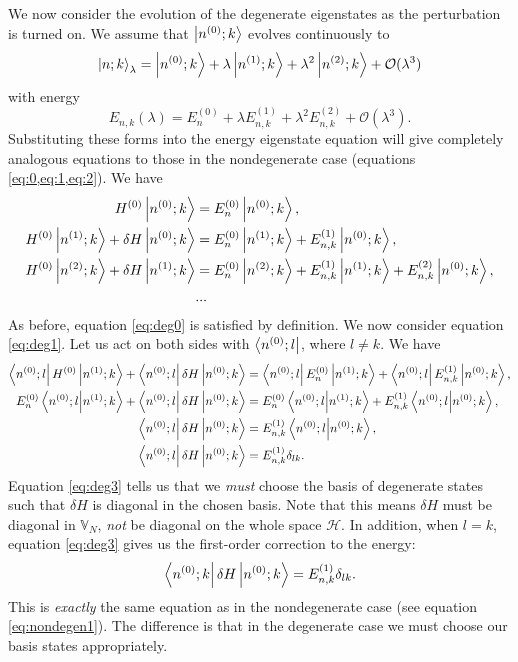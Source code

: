 We now consider the evolution of the degenerate eigenstates as the perturbation is turned on. We assume that $\left| n^{(0)};k \right\rangle$ evolves continuously to \[\left| n;k \right\rangle_\lambda = \left| n^{(0)};k \right\rangle + \lambda \left| n^{(1)};k \right\rangle + \lambda^2 \left| n^{(2)};k \right\rangle + \mathcal{O}(\lambda^3) \]
with energy 
\[ E_{n,k} (\lambda) = E_n^{(0)} + \lambda E_{n,k}^{(1)} + \lambda^2 E_{n,k}^{(2)} + \mathcal{O}(\lambda^3).\]
Substituting these forms into the energy eigenstate equation will give completely analogous equations to those in the nondegenerate case (equations \cref{eq:0,eq:1,eq:2}). We have
\begin{align}
H^{(0)} \left| n^{(0)};k \right\rangle &= E_n^{(0)} \left| n^{(0)};k \right\rangle,  \label{eq:deg0}\\
H^{(0)} \left| n^{(1)};k \right\rangle + \delta H \left| n^{(0)};k \right\rangle &= E_n^{(0)} \left| n^{(1)};k \right\rangle + E_{n,k}^{(1)} \left| n^{(0)};k \right\rangle,  \label{eq:deg1}\\
H^{(0)} \left| n^{(2)};k \right\rangle + \delta H \left| n^{(1)};k \right\rangle &= E_n^{(0)} \left| n^{(2)};k \right\rangle + E_{n,k}^{(1)} \left| n^{(1)};k \right\rangle + E_{n,k}^{(2)} \left| n^{(0)};k \right\rangle,  \label{eq:deg2}\\
&... \nonumber
\end{align} 
As before, equation \ref{eq:deg0} is satisfied by definition. We now consider equation \ref{eq:deg1}. Let us act on both sides with $\left\langle n^{(0)}; l \right|$, where $l \neq k$. We have 
\begin{align}
\left\langle n^{(0)}; l \right|H^{(0)} \left| n^{(1)};k \right\rangle+\left\langle n^{(0)}; l \right| \delta H \left| n^{(0)};k \right\rangle &= \left\langle n^{(0)}; l \right|E_n^{(0)} \left| n^{(1)};k \right\rangle+\left\langle n^{(0)}; l \right|E_{n,k}^{(1)} \left| n^{(0)};k \right\rangle,\nonumber \\
E_n^{(0)} \left\langle n^{(0)};l \middle| n^{(1)};k \right\rangle + \left\langle n^{(0)}; l \right| \delta H \left| n^{(0)};k \right\rangle &= E_n^{(0)} \left\langle n^{(0)};l \middle| n^{(1)};k \right\rangle + E_{n,k}^{(1)} \left\langle n^{(0)};l \middle| n^{(0)};k \right\rangle,\nonumber \\
 \left\langle n^{(0)}; l \right| \delta H \left| n^{(0)};k \right\rangle &= E_{n,k}^{(1)} \left\langle n^{(0)};l \middle| n^{(0)};k \right\rangle, \nonumber \\
 \left\langle n^{(0)}; l \right| \delta H \left| n^{(0)};k \right\rangle &= E_{n,k}^{(1)} \delta_{lk}.\label{eq:deg3}
\end{align}
Equation \ref{eq:deg3} tells us that we \textit{must} choose the basis of degenerate states such that $\delta H$ is diagonal in the chosen basis. Note that this means $\delta H$ must be diagonal in $\mathbb{V}_N$, \textit{not} be diagonal on the whole space $\mathcal{H}$.
In addition, when $l = k$, equation \ref{eq:deg3} gives us the first-order correction to the energy:
\[\left\langle n^{(0)}; k \right| \delta H \left| n^{(0)};k \right\rangle = E_{n,k}^{(1)} \delta_{lk}\label{eq:degEFirstOrder}.\] This is \textit{exactly} the same equation as in the nondegenerate case (see equation \ref{eq:nondegen1}). The difference is that in the degenerate case we must choose our basis states appropriately. 

